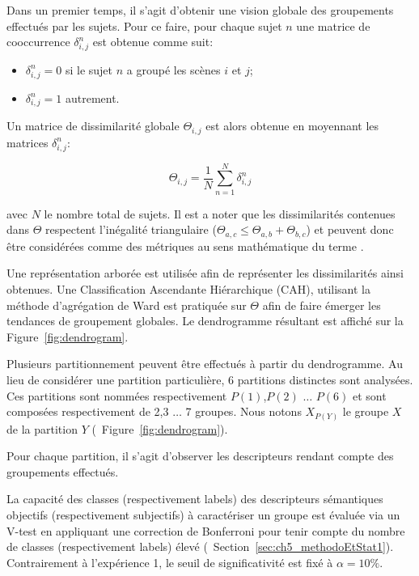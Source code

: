Dans un premier temps, il s'agit d'obtenir une vision globale des groupements effectués par les sujets. Pour ce faire, pour chaque sujet $n$ une matrice de cooccurrence $\delta^n_{i,j}$ est obtenue comme suit:

\begin{itemize}
\item $\delta^n_{i,j}=0$ si le sujet $n$ a groupé les scènes $i$ et $j$;
\item $\delta^n_{i,j}=1$ autrement.
\end{itemize}

Un matrice de dissimilarité globale $\Theta_{i,j}$ est alors obtenue en moyennant les matrices $\delta^n_{i,j}$:

\begin{equation}
\Theta_{i,j}= \dfrac{1}{N} \sum_{n=1}^{N}  \delta^n_{i,j}
\end{equation}

avec $N$ le nombre total de sujets. Il est a noter que les dissimilarités contenues dans $\Theta$ respectent l'inégalité triangulaire ($\Theta_{a,c}\leq\Theta_{a,b}+\Theta_{b,c}$) et peuvent donc être considérées comme des métriques au sens mathématique du terme \citep{parizet2012application}. 

Une représentation arborée est utilisée afin de représenter les dissimilarités ainsi obtenues. Une Classification Ascendante Hiérarchique (CAH), utilisant la méthode d’agrégation de Ward est pratiquée sur $\Theta$  afin de faire émerger les tendances de groupement globales. Le dendrogramme résultant est affiché sur la Figure~\ref{fig:dendrogram}. 

Plusieurs partitionnement peuvent être effectués à partir du dendrogramme. Au lieu de considérer une partition particulière, 6  partitions distinctes sont analysées. Ces partitions sont nommées respectivement $P(1)$,$P(2)$ $\ldots$ $P(6)$ et sont composées respectivement de 2,3 $\ldots$ 7 groupes. Nous notons $X_{P(Y)}$ le groupe $X$ de la partition $Y$ (\cf~Figure~\ref{fig:dendrogram}).

Pour chaque partition, il s'agit d'observer les descripteurs rendant compte des groupements effectués. 

La capacité des classes (respectivement labels) des descripteurs sémantiques objectifs (respectivement subjectifs) à caractériser un groupe est évaluée via un V-test en appliquant une correction de Bonferroni pour tenir compte du nombre de classes (respectivement labels) élevé (\cf~Section~\ref{sec:ch5_methodoEtStat1}). Contrairement à l'expérience 1, le seuil de significativité est fixé à $\alpha=10\%$.

